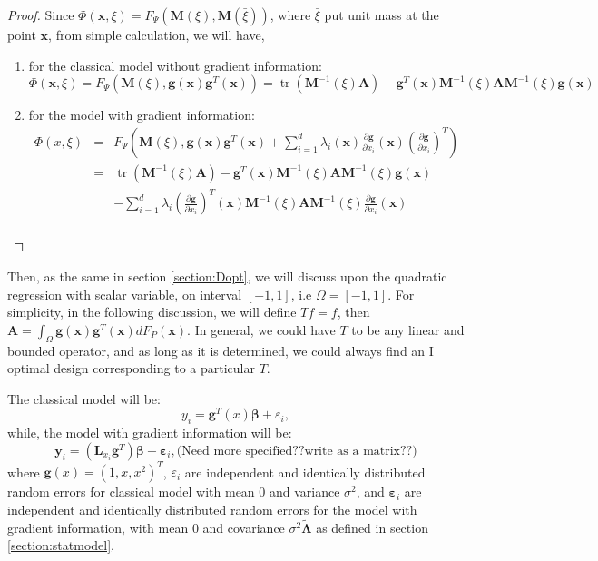 \documentclass[preprint,12pt]{elsarticle}
\DeclareMathOperator{\tr}{tr} \DeclareMathOperator{\err}{err}
\begin{document}
\begin{proof}
Since
$\Phi(\boldsymbol{x},\xi)=F_{\Psi}(\boldsymbol{M}(\xi),\boldsymbol{M}(\bar{\xi}))$,
where $\bar{\xi}$ put unit mass at the point $\boldsymbol{x}$, from
simple calculation, we will have,
\begin{enumerate}
\item for the classical model without gradient information:
$$\Phi(\boldsymbol{x},\xi)=F_{\Psi}(\boldsymbol{M}(\xi),\boldsymbol{g}(\boldsymbol{x})\boldsymbol{g}^T(\boldsymbol{x}))=\tr(\boldsymbol{M}^{-1}(\xi)\boldsymbol{A})-\boldsymbol{g}^T(\boldsymbol{x})\boldsymbol{M}^{-1}(\xi)\boldsymbol{A}\boldsymbol{M}^{-1}(\xi)\boldsymbol{g}(\boldsymbol{x})$$


\item for the model with gradient information:
\begin{eqnarray*}
\Phi(x,\xi)&=&F_{\Psi}\left(\boldsymbol{M}(\xi),\boldsymbol{g}(\boldsymbol{x})\boldsymbol{g}^T(\boldsymbol{x})+\sum_{i=1}^d\lambda_i(\boldsymbol{x})\frac{\partial\boldsymbol{g}}{\partial
x_i}(\boldsymbol{x})\left(\frac{\partial\boldsymbol{g}}{\partial
x_i}\right)^T\right)\\
&=&\tr(\boldsymbol{M}^{-1}(\xi)\boldsymbol{A})-\boldsymbol{g}^T(\boldsymbol{x})\boldsymbol{M}^{-1}(\xi)\boldsymbol{A}\boldsymbol{M}^{-1}(\xi)\boldsymbol{g}(\boldsymbol{x})\\
&&-\sum_{i=1}^d\lambda_i\left(\frac{\partial\boldsymbol{g}}{\partial
x_i}\right)^T(\boldsymbol{x})\boldsymbol{M}^{-1}(\xi)\boldsymbol{A}\boldsymbol{M}^{-1}(\xi)\frac{\partial\boldsymbol{g}}{\partial
x_i}(\boldsymbol{x})\\
\end{eqnarray*}
\end{enumerate}
\end{proof}

Then, as the same in section \ref{section:Dopt}, we will discuss
upon the quadratic regression with scalar variable, on interval
$[-1,1]$, i.e $\Omega=[-1,1]$. For simplicity, in the following
discussion, we will define $Tf=f$, then
$\boldsymbol{A}=\int_{\Omega}\boldsymbol{g}(\boldsymbol{x})\boldsymbol{g}^T(\boldsymbol{x})dF_P(\boldsymbol{x})$.
In general, we could have $T$ to be any linear and bounded operator,
and as long as it is determined, we could always find an I optimal
design corresponding to a particular $T$.

The classical model will be:
$$y_i=\boldsymbol{g}^T(x)\boldsymbol{\beta}+\varepsilon_i,$$
while, the model with gradient information will be:
$$\boldsymbol{y}_i=(\mathbf{L}_{x_i}\boldsymbol{g}^T)\boldsymbol{\beta}+\boldsymbol{\varepsilon}_i,\text{(Need more specified??write as a matrix??)}$$
where $\boldsymbol{g}(x)=(1,x,x^2)^T$, $\varepsilon_i$ are
independent and identically distributed random errors for classical
model with mean $0$ and variance $\sigma^2$, and
$\boldsymbol{\varepsilon}_i$ are independent and identically
distributed random errors for the model with gradient information,
with mean $0$ and covariance
$\sigma^2\widetilde{\boldsymbol{\Lambda}}$ as defined in section
\ref{section:statmodel}.
\end{document}

